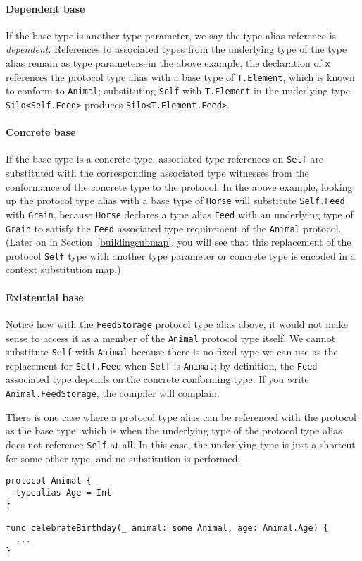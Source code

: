 \documentclass[a4paper,headsepline,bibliography=totoc,toc=flat,fleqn,twoside=semi]{scrbook}
\theoremstyle{definition}
\theoremstyle{definition}
\theoremstyle{definition}
\begin{document}
\paragraph{Dependent base}
If the base type is another type parameter, we say the type alias reference is \emph{dependent}. References to associated types from the underlying type of the type alias remain as type parameters--in the above example, the declaration of \texttt{x} references the protocol type alias with a base type of \texttt{T.Element}, which is known to conform to \texttt{Animal}; substituting \texttt{Self} with \texttt{T.Element} in the underlying type \texttt{Silo<Self.Feed>} produces \texttt{Silo<T.Element.Feed>}.

\paragraph{Concrete base}
If the base type is a concrete type, associated type references on \texttt{Self} are substituted with the corresponding associated type witnesses from the conformance of the concrete type to the protocol. In the above example, looking up the protocol type alias with a base type of \texttt{Horse} will substitute \texttt{Self.Feed} with \texttt{Grain}, because \texttt{Horse} declares a type alias \texttt{Feed} with an underlying type of \texttt{Grain} to satisfy the \texttt{Feed} associated type requirement of the \texttt{Animal} protocol. (Later on in Section~\ref{buildingsubmap}, you will see that this replacement of the protocol \texttt{Self} type with another type parameter or concrete type is encoded in a context substitution map.)

\paragraph{Existential base}
Notice how with the \texttt{FeedStorage} protocol type alias above, it would not make sense to access it as a member of the \texttt{Animal} protocol type itself. We cannot substitute \texttt{Self} with \texttt{Animal} because there is no fixed type we can use as the replacement for \texttt{Self.Feed} when \texttt{Self} is \texttt{Animal}; by definition, the \texttt{Feed} associated type depends on the concrete conforming type. If you write \texttt{Animal.FeedStorage}, the compiler will complain.

There is one case where a protocol type alias can be referenced with the protocol as the base type, which is when the underlying type of the protocol type alias does not reference \texttt{Self} at all. In this case, the underlying type is just a shortcut for some other type, and no substitution is performed:
\begin{Verbatim}
protocol Animal {
  typealias Age = Int
}

func celebrateBirthday(_ animal: some Animal, age: Animal.Age) {
  ...
}
\end{Verbatim}
\end{document}
